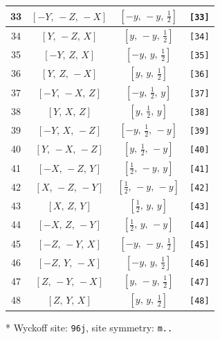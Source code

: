 \documentclass[fleqn,8pt]{jsarticle}
\begin{document}
\begin{longtable}{cccc}
33 & $\left[ - Y,\, - Z,\, - X \right]$ & $\left[ - y,\, - y,\, \frac{1}{2} \right]$ & {\tt [33]} \\ \hline
34 & $\left[ Y,\, - Z,\, X \right]$ & $\left[ y,\, - y,\, \frac{1}{2} \right]$ & {\tt [34]} \\ \hline
35 & $\left[ - Y,\, Z,\, X \right]$ & $\left[ - y,\, y,\, \frac{1}{2} \right]$ & {\tt [35]} \\ \hline
36 & $\left[ Y,\, Z,\, - X \right]$ & $\left[ y,\, y,\, \frac{1}{2} \right]$ & {\tt [36]} \\ \hline
37 & $\left[ - Y,\, - X,\, Z \right]$ & $\left[ - y,\, \frac{1}{2},\, y \right]$ & {\tt [37]} \\ \hline
38 & $\left[ Y,\, X,\, Z \right]$ & $\left[ y,\, \frac{1}{2},\, y \right]$ & {\tt [38]} \\ \hline
39 & $\left[ - Y,\, X,\, - Z \right]$ & $\left[ - y,\, \frac{1}{2},\, - y \right]$ & {\tt [39]} \\ \hline
40 & $\left[ Y,\, - X,\, - Z \right]$ & $\left[ y,\, \frac{1}{2},\, - y \right]$ & {\tt [40]} \\ \hline
41 & $\left[ - X,\, - Z,\, Y \right]$ & $\left[ \frac{1}{2},\, - y,\, y \right]$ & {\tt [41]} \\ \hline
42 & $\left[ X,\, - Z,\, - Y \right]$ & $\left[ \frac{1}{2},\, - y,\, - y \right]$ & {\tt [42]} \\ \hline
43 & $\left[ X,\, Z,\, Y \right]$ & $\left[ \frac{1}{2},\, y,\, y \right]$ & {\tt [43]} \\ \hline
44 & $\left[ - X,\, Z,\, - Y \right]$ & $\left[ \frac{1}{2},\, y,\, - y \right]$ & {\tt [44]} \\ \hline
45 & $\left[ - Z,\, - Y,\, X \right]$ & $\left[ - y,\, - y,\, \frac{1}{2} \right]$ & {\tt [45]} \\ \hline
46 & $\left[ - Z,\, Y,\, - X \right]$ & $\left[ - y,\, y,\, \frac{1}{2} \right]$ & {\tt [46]} \\ \hline
47 & $\left[ Z,\, - Y,\, - X \right]$ & $\left[ y,\, - y,\, \frac{1}{2} \right]$ & {\tt [47]} \\ \hline
48 & $\left[ Z,\, Y,\, X \right]$ & $\left[ y,\, y,\, \frac{1}{2} \right]$ & {\tt [48]} \\
\end{longtable}
* Wyckoff site: {\tt 96j}, site symmetry: {\tt m..}
\renewcommand{\arraystretch}{1.2}
\end{document}
